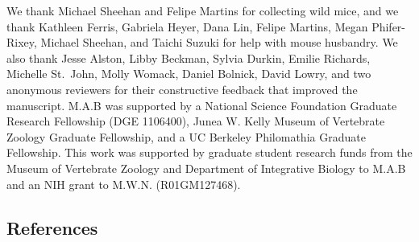 \documentclass[
]{article}
\begin{document}
\noindent We thank Michael Sheehan and Felipe Martins for collecting
wild mice, and we thank Kathleen Ferris, Gabriela Heyer, Dana Lin,
Felipe Martins, Megan Phifer-Rixey, Michael Sheehan, and Taichi Suzuki
for help with mouse husbandry. We also thank Jesse Alston, Libby
Beckman, Sylvia Durkin, Emilie Richards, Michelle St.~John, Molly
Womack, Daniel Bolnick, David Lowry, and two anonymous reviewers for
their constructive feedback that improved the manuscript. M.A.B was
supported by a National Science Foundation Graduate Research Fellowship
(DGE 1106400), Junea W. Kelly Museum of Vertebrate Zoology Graduate
Fellowship, and a UC Berkeley Philomathia Graduate Fellowship. This work
was supported by graduate student research funds from the Museum of
Vertebrate Zoology and Department of Integrative Biology to M.A.B and an
NIH grant to M.W.N. (R01GM127468).

\vspace{5mm}

\hypertarget{references}{%
\subsection{References}\label{references}}

\setlength{\parindent}{-0.25in}
\setlength{\leftskip}{0.25in}

\noindent
\end{document}
